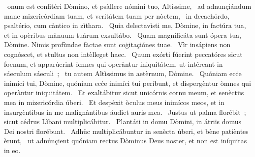 \psalmChapterWithInscription{}
{ }
{%
~onum est confitéri Dòmino, et psàllere nómini tuo, Altìssime, 
~ad adnunçiándum mane mizericórdiam tuam, et veritátem tuam per nòctem, 
~in decachórdo, psaltério, cum càntico in zìthara. 
~Quia delectavìsti me, Dòmine, in factúra tua, et in opèribus mànuum tuárum exsultábo. 
~Quam magnificáta sunt ópera tua, Dòmine. Nimis profùndae fàctae sunt coġitaçiónes tuae. 
~Vìr insápiens non cognóscet, et stultus non intèlleget haec. 
~Quum exórti fúerint peccatóres sicut foenum, et apparúerint òmnes qui operàntur iniquitátem, ut intéreant in sáeculum sáeculi~; 
~tu autem Altìssimus in aetèrnum, Dòmine. 
~Quóniam ecċe inimíci tui, Dòmine, quóniam ecċe inimíci tui períbunt, et dispergèntur òmnes qui operàntur iniquitátem. 
~Et exaltábitur sicut unicórnis cornu meum, et senèctüs mea in mizericórdia úberi. 
~Et despèxit òculus meus inimícos meos, et in insurgèntibus in me malignàntibus áudiet auris mea. 
~Justus ut palma florébit~; sicut cédrus Lìbani multiplicábitur. 
~Plantáti in domu Dòmini, in átriïs domus Dei nostri florébunt. 
~Adhüc multiplicábuntur in senècta úberi, et bène patièntes èrunt, 
~ut adnúnçient quóniam rectus Dòminus Deus noster, et non est iníquitas in eo. 
}
